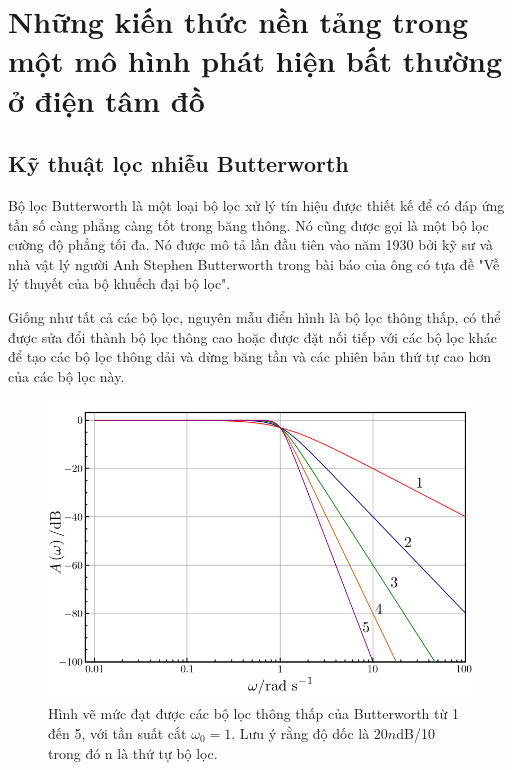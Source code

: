 \chapter{Những kiến thức nền tảng trong một mô hình phát hiện bất thường ở điện tâm đồ}
\thispagestyle{fancy}

\section{Kỹ thuật lọc nhiễu Butterworth}
Bộ lọc Butterworth là một loại bộ lọc xử lý tín hiệu được thiết kế để có đáp ứng tần số càng phẳng càng tốt trong băng thông. Nó cũng được gọi là một bộ lọc cường độ phẳng tối đa. Nó được mô tả lần đầu tiên vào năm 1930 bởi kỹ sư và nhà vật lý người Anh Stephen Butterworth trong bài báo của ông có tựa đề "Về lý thuyết của bộ khuếch đại bộ lọc".\par
Giống như tất cả các bộ lọc, nguyên mẫu điển hình là bộ lọc thông thấp, có thể được sửa đổi thành bộ lọc thông cao hoặc được đặt nối tiếp với các bộ lọc khác để tạo các bộ lọc thông dải và dừng băng tần và các phiên bản thứ tự cao hơn của các bộ lọc này.\par
\begin{center}
    \begin{figure}[htp]
    \begin{center}
    \includegraphics[scale=.4]{image/chapter4/800px-Butterworth_Filter_Orders.png}
    \end{center}
    \caption{Hình vẽ mức đạt được các bộ lọc thông thấp của Butterworth từ 1 đến 5, với tần suất cắt $\omega_0 = 1$. Lưu ý rằng độ dốc là $20n$dB/10 trong đó n là thứ tự bộ lọc.}
    \end{figure}
\end{center}
